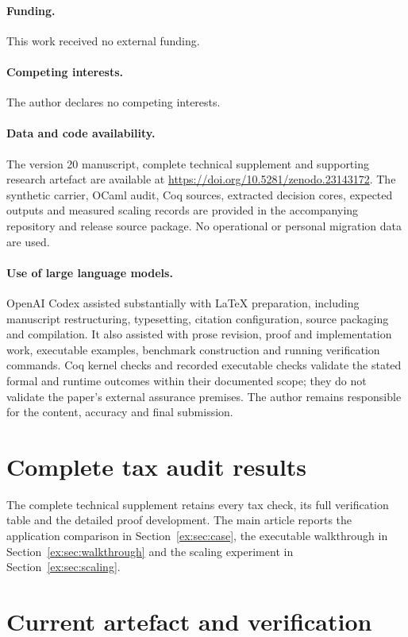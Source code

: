 \documentclass[twocolumn,envcountsect,envcountsame,natbib]{svjour3}
\begin{document}
\paragraph{Funding.} This work received no external funding.
\paragraph{Competing interests.} The author declares no competing interests.
\paragraph{Data and code availability.} The version 20 manuscript, complete technical supplement and supporting research artefact are available at \url{https://doi.org/10.5281/zenodo.23143172}. The synthetic carrier, OCaml audit, Coq sources, extracted decision cores, expected outputs and measured scaling records are provided in the accompanying repository and release source package. No operational or personal migration data are used.
\paragraph{Use of large language models.} OpenAI Codex assisted substantially with LaTeX preparation, including manuscript restructuring, typesetting, citation configuration, source packaging and compilation. It also assisted with prose revision, proof and implementation work, executable examples, benchmark construction and running verification commands. Coq kernel checks and recorded executable checks validate the stated formal and runtime outcomes within their documented scope; they do not validate the paper's external assurance premises. The author remains responsible for the content, accuracy and final submission.

\appendix

\section{Complete tax audit results}\label{ex:app:tax-results}
\label{ex:tab:case-results-full}\label{ex:app:tax-reference}
The complete technical supplement retains every tax check, its full verification table and the detailed proof development. The main article reports the application comparison in Section~\ref{ex:sec:case}, the executable walkthrough in Section~\ref{ex:sec:walkthrough} and the scaling experiment in Section~\ref{ex:sec:scaling}.

\section{Current artefact and verification}\label{ex:app:verification}
\label{ex:app:extension}\label{ex:app:mechanisation}
\end{document}

